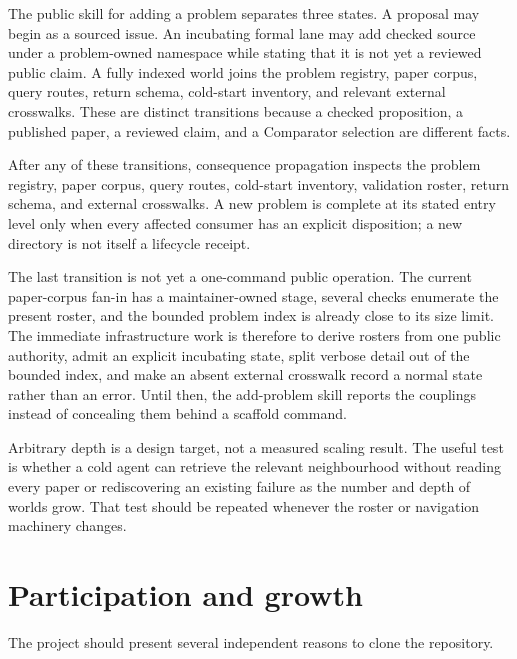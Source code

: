 \documentclass[10pt]{article}
\begin{document}
The public skill for adding a problem separates three states.  A proposal may
begin as a sourced issue.  An incubating formal lane may add checked source
under a problem-owned namespace while stating that it is not yet a reviewed
public claim.  A fully indexed world joins the problem registry, paper corpus,
query routes, return schema, cold-start inventory, and relevant external
crosswalks.  These are distinct transitions because a checked proposition, a
published paper, a reviewed claim, and a Comparator selection are different
facts.

After any of these transitions, consequence propagation inspects the problem
registry, paper corpus, query routes, cold-start inventory, validation roster,
return schema, and external crosswalks. A new problem is complete at its stated
entry level only when every affected consumer has an explicit disposition; a
new directory is not itself a lifecycle receipt.

The last transition is not yet a one-command public operation.  The current
paper-corpus fan-in has a maintainer-owned stage, several checks enumerate the
present roster, and the bounded problem index is already close to its size
limit.  The immediate infrastructure work is therefore to derive rosters from
one public authority, admit an explicit incubating state, split verbose detail
out of the bounded index, and make an absent external crosswalk record a normal
state rather than an error.  Until then, the add-problem skill reports the
couplings instead of concealing them behind a scaffold command.

Arbitrary depth is a design target, not a measured scaling result.  The useful
test is whether a cold agent can retrieve the relevant neighbourhood without
reading every paper or rediscovering an existing failure as the number and
depth of worlds grow.  That test should be repeated whenever the roster or
navigation machinery changes.

\section{Participation and growth}\label{sec:growth}

The project should present several independent reasons to clone the
repository.
\end{document}
